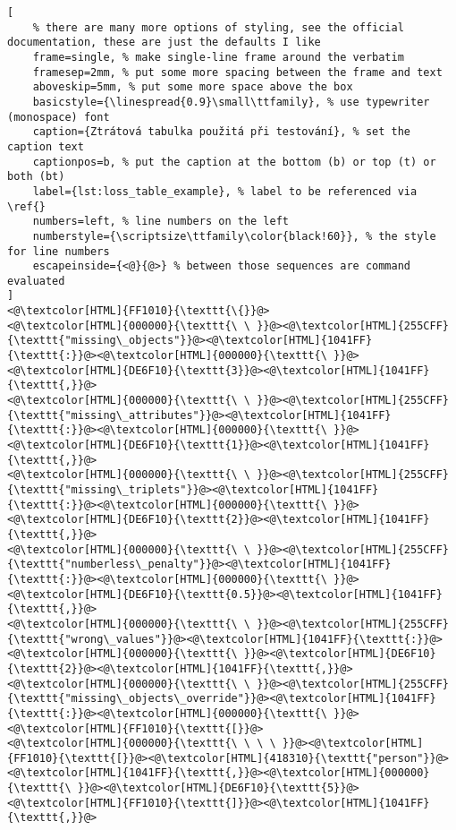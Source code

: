 \begin{lstlisting}[
	% there are many more options of styling, see the official documentation, these are just the defaults I like
	frame=single, % make single-line frame around the verbatim
	framesep=2mm, % put some more spacing between the frame and text
	aboveskip=5mm, % put some more space above the box
	basicstyle={\linespread{0.9}\small\ttfamily}, % use typewriter (monospace) font
	caption={Ztrátová tabulka použitá při testování}, % set the caption text
	captionpos=b, % put the caption at the bottom (b) or top (t) or both (bt)
	label={lst:loss_table_example}, % label to be referenced via \ref{}
	numbers=left, % line numbers on the left
	numberstyle={\scriptsize\ttfamily\color{black!60}}, % the style for line numbers
	escapeinside={<@}{@>} % between those sequences are command evaluated
]
<@\textcolor[HTML]{FF1010}{\texttt{\{}}@>
<@\textcolor[HTML]{000000}{\texttt{\ \ }}@><@\textcolor[HTML]{255CFF}{\texttt{"missing\_objects"}}@><@\textcolor[HTML]{1041FF}{\texttt{:}}@><@\textcolor[HTML]{000000}{\texttt{\ }}@><@\textcolor[HTML]{DE6F10}{\texttt{3}}@><@\textcolor[HTML]{1041FF}{\texttt{,}}@>
<@\textcolor[HTML]{000000}{\texttt{\ \ }}@><@\textcolor[HTML]{255CFF}{\texttt{"missing\_attributes"}}@><@\textcolor[HTML]{1041FF}{\texttt{:}}@><@\textcolor[HTML]{000000}{\texttt{\ }}@><@\textcolor[HTML]{DE6F10}{\texttt{1}}@><@\textcolor[HTML]{1041FF}{\texttt{,}}@>
<@\textcolor[HTML]{000000}{\texttt{\ \ }}@><@\textcolor[HTML]{255CFF}{\texttt{"missing\_triplets"}}@><@\textcolor[HTML]{1041FF}{\texttt{:}}@><@\textcolor[HTML]{000000}{\texttt{\ }}@><@\textcolor[HTML]{DE6F10}{\texttt{2}}@><@\textcolor[HTML]{1041FF}{\texttt{,}}@>
<@\textcolor[HTML]{000000}{\texttt{\ \ }}@><@\textcolor[HTML]{255CFF}{\texttt{"numberless\_penalty"}}@><@\textcolor[HTML]{1041FF}{\texttt{:}}@><@\textcolor[HTML]{000000}{\texttt{\ }}@><@\textcolor[HTML]{DE6F10}{\texttt{0.5}}@><@\textcolor[HTML]{1041FF}{\texttt{,}}@>
<@\textcolor[HTML]{000000}{\texttt{\ \ }}@><@\textcolor[HTML]{255CFF}{\texttt{"wrong\_values"}}@><@\textcolor[HTML]{1041FF}{\texttt{:}}@><@\textcolor[HTML]{000000}{\texttt{\ }}@><@\textcolor[HTML]{DE6F10}{\texttt{2}}@><@\textcolor[HTML]{1041FF}{\texttt{,}}@>
<@\textcolor[HTML]{000000}{\texttt{\ \ }}@><@\textcolor[HTML]{255CFF}{\texttt{"missing\_objects\_override"}}@><@\textcolor[HTML]{1041FF}{\texttt{:}}@><@\textcolor[HTML]{000000}{\texttt{\ }}@><@\textcolor[HTML]{FF1010}{\texttt{[}}@>
<@\textcolor[HTML]{000000}{\texttt{\ \ \ \ }}@><@\textcolor[HTML]{FF1010}{\texttt{[}}@><@\textcolor[HTML]{418310}{\texttt{"person"}}@><@\textcolor[HTML]{1041FF}{\texttt{,}}@><@\textcolor[HTML]{000000}{\texttt{\ }}@><@\textcolor[HTML]{DE6F10}{\texttt{5}}@><@\textcolor[HTML]{FF1010}{\texttt{]}}@><@\textcolor[HTML]{1041FF}{\texttt{,}}@>

\end{lstlisting}
